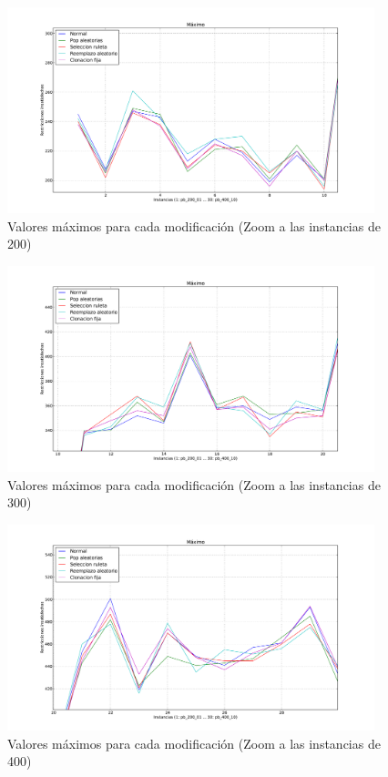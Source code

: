 \begin{figure}[H]
\begin{center}
\includegraphics[width=0.95\textwidth]{img/max-zoom200.pdf}
\end{center}
\caption{Valores máximos para cada modificación (Zoom a las instancias de 200)}
\label{fig:max200}
\end{figure}

\begin{figure}[H]
\begin{center}
\includegraphics[width=0.95\textwidth]{img/max-zoom300.pdf}
\end{center}
\caption{Valores máximos para cada modificación (Zoom a las instancias de 300)}
\label{fig:max300}
\end{figure}

\begin{figure}[H]
\begin{center}
\includegraphics[width=0.95\textwidth]{img/max-zoom400.pdf}
\end{center}
\caption{Valores máximos para cada modificación (Zoom a las instancias de 400)}
\label{fig:max400}
\end{figure}

